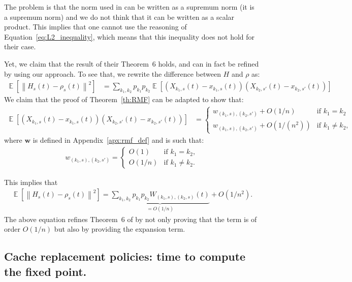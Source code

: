 \documentclass[acmsmall]{acmart}
\newcommand\bw{\mathbf{w}}
\DeclareMathOperator{\E}{\mathbb{E}} %
\newcommand\esp[1]{\E\left[#1\right]} %
\newcommand\norm[1]{\left\|#1\right\|}      %
\begin{document}
The problem is that the norm used in \cite{gastTransientSteadystateRegime2015} can be written as a supremum norm (it is a supremum norm) and we do not think that it can be written as a scalar product. This implies that one cannot use the reasoning of Equation~\eqref{eq:L2_inequality}, which means that this inequality does not hold for their case.

Yet, we claim that the result of their Theorem~6 holds, and can in fact be refined by using our approach. To see that, we rewrite the difference between $H$ and $\rho$ as:
\begin{align}
  \label{eq:L2_equality}
  \esp{\norm{ H_s(t) - \rho_s(t)}^2} &= \sum_{k_1,k_2} p_{k_1} p_{k_2} \esp{(X_{k_1,s}(t)-x_{k_1,s}(t))(X_{k_2,s'}(t)-x_{k_2,s'}(t))}
\end{align}
We claim that the proof of Theorem~\ref{th:RMF} can be adapted to show that:
\begin{align*}
  \esp{(X_{k_1,s}(t)-x_{k_1,s}(t))(X_{k_2,s'}(t)-x_{k_2,s'}(t))} &= \left\{
    \begin{array}{ll}
      w_{(k_1,s),(k_2,s')} + O(1/n) & \text{if $k_1=k_2$}\\
      w_{(k_1,s),(k_2,s')} + O(1/(n^2)) & \text{if $k_1\ne k_2$},
    \end{array}
  \right.
\end{align*}
where $\bw$ is defined in Appendix~\ref{apx:rmf_def} and is such that:
\begin{align*}
  w_{(k_1,s),(k_2,s')} = \left\{
  \begin{array}{ll}
    O(1) & \text{if $k_1=k_2$},\\
    O(1/n) & \text{if $k_1\ne k_2$}.
  \end{array}
  \right.
\end{align*}

This implies that
\begin{align*}
  \esp{\norm{ H_s(t) - \rho_s(t)}^2}  = \underbrace{\sum_{k_1,k_2}  p_{k_1} p_{k_2} W_{(k_1,s),(k_2,s)}(t)}_{=O(1/n)} + O(1/n^2).
\end{align*}
The above equation refines Theorem~6 of \cite{gastTransientSteadystateRegime2015} by not only proving that the term is of order $O(1/n)$ but also by providing the expansion term.



\subsection{Cache replacement policies: time to compute the fixed point.}
\label{apx:cache_computation}
\end{document}
